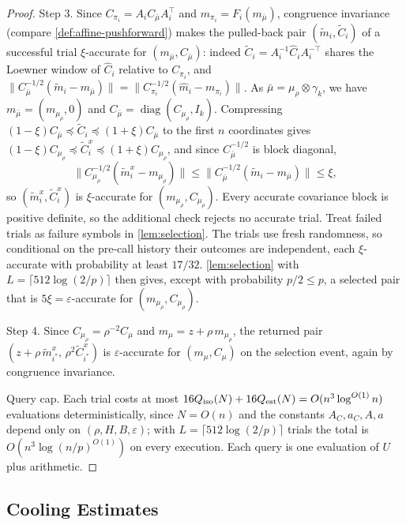 \documentclass[11pt]{article}
\numberwithin{equation}{section}
\theoremstyle{definition}
\newcommand{\eps}{\varepsilon}
\begin{document}
\begin{proof}
Step 3.
Since $C_{\pi_i}=A_iC_{\bar\mu}A_i^\top$ and
$m_{\pi_i}=F_i(m_{\bar\mu})$, congruence invariance (compare
\cref{def:affine-pushforward}) makes the pulled-back pair
$(\widetilde m_i,\widetilde C_i)$ of a successful trial
$\xi$-accurate for
$(m_{\bar\mu},C_{\bar\mu})$: indeed
$\widetilde C_i=A_i^{-1}\widehat C_iA_i^{-\top}$ shares the Loewner window of
$\widehat C_i$ relative to
$C_{\pi_i}$, and
$\|C_{\bar\mu}^{-1/2}(\widetilde m_i-m_{\bar\mu})\| =\|C_{\pi_i}^{-1/2}(\widehat m_i-m_{\pi_i})\|$.
As $\bar\mu=\mu_\rho\otimes\gamma_k$, we have
$m_{\bar\mu}=(m_{\mu_\rho},0)$ and
$C_{\bar\mu}=\operatorname{diag}(C_{\mu_\rho},I_k)$.
Compressing $(1-\xi)C_{\bar\mu}\preceq\widetilde C_i\preceq(1+\xi)C_{\bar\mu}$
to the first
$n$ coordinates gives
$(1-\xi)C_{\mu_\rho}\preceq\widetilde C_i^x\preceq(1+\xi)C_{\mu_\rho}$, and
since $C_{\bar\mu}^{-1/2}$ is block diagonal,
\[
 \|C_{\mu_\rho}^{-1/2}(\widetilde m_i^x-m_{\mu_\rho})\|
 \leq\|C_{\bar\mu}^{-1/2}(\widetilde m_i-m_{\bar\mu})\|
 \leq\xi ,
\]
so $(\widetilde m_i^x,\widetilde C_i^x)$ is
$\xi$-accurate for
$(m_{\mu_\rho},C_{\mu_\rho})$.
Every accurate covariance block is positive definite, so the additional
check rejects no accurate trial. Treat failed trials as failure symbols
in \cref{lem:selection}.
The trials use fresh randomness, so conditional on the pre-call history their
outcomes are independent, each
$\xi$-accurate with probability at least
$17/32$.
\cref{lem:selection} with $L=\lceil512\log(2/p)\rceil$ then gives, except with
probability
$p/2\leq p$, a selected pair that is
$5\xi=\eps$-accurate for
$(m_{\mu_\rho},C_{\mu_\rho})$.

Step 4.
Since $C_{\mu_\rho}=\rho^{-2}C_\mu$ and
$m_\mu=z+\rho\,m_{\mu_\rho}$, the returned pair
$(z+\rho\,\widetilde m_{i^*}^x,\,\rho^2\widetilde C_{i^*}^x)$ is
$\eps$-accurate for
$(m_\mu,C_\mu)$ on the selection event, again by congruence invariance.

Query cap.
Each trial costs at most $16Q_{\rm iso}(N)+16Q_{\rm est}(N)=O(n^3\log^{O(1)}n)$
evaluations deterministically, since
$N=O(n)$ and the constants
$A_C,a_C,A,a$ depend only on
$(\rho,H,B,\eps)$; with
$L=\lceil512\log(2/p)\rceil$ trials the total is
$O(n^3\log(n/p)^{O(1)})$ on every execution.
Each query is one evaluation of $U$ plus arithmetic.
\end{proof}

\subsection{Cooling Estimates}
\label{sec:cooling-estimates}
\end{document}
